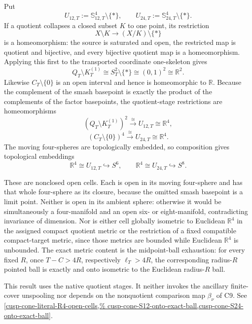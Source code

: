 \begin{auditrecord}
\Verified Put
\[
 U_{12,T}:=\mathbb S_{12,T}^4\setminus\{*\},
 \qquad
 U_{24,T}:=\mathbb S_{24,T}^4\setminus\{*\}.
\]
If a quotient collapses a closed subset \(K\) to one point, its restriction
\[
 X\setminus K\longrightarrow (X/K)\setminus\{*\}
\]
is a homeomorphism: the source is saturated and open, the restricted map is
quotient and bijective, and every bijective quotient map is a homeomorphism.
Applying this first to the transported coordinate one-skeleton gives
\[
 Q_T\setminus K_T^{(1)}
 \cong S_T^2\setminus\{*\}
 \cong (0,1)^2\cong\mathbb R^2.
\]
Likewise \(C_T\setminus\{0\}\) is an open interval and hence is
homeomorphic to \(\mathbb R\).  Because the complement of the smash
basepoint is exactly the product of the complements of the factor
basepoints, the quotient-stage restrictions are homeomorphisms
\[
 (Q_T\setminus K_T^{(1)})^2
 \xrightarrow{\ \cong\ }U_{12,T}\cong\mathbb R^4,
\]
\[
 (C_T\setminus\{0\})^4
 \xrightarrow{\ \cong\ }U_{24,T}\cong\mathbb R^4.
\]
The moving four-spheres are topologically embedded, so composition gives
topological embeddings
\[
 \mathbb R^4\cong U_{12,T}\hookrightarrow S^6,
 \qquad
 \mathbb R^4\cong U_{24,T}\hookrightarrow S^8.
\]

These are nonclosed open cells.  Each is open in its moving four-sphere and
has that whole four-sphere as its closure, because the omitted smash
basepoint is a limit point.  Neither is open in its ambient sphere:
otherwise it would be simultaneously a four-manifold and an open six- or
eight-manifold, contradicting invariance of dimension.  Nor is either cell
globally isometric to Euclidean \(\mathbb R^4\) in the assigned compact
quotient metric or the restriction of a fixed compatible compact-target
metric, since those metrics are bounded while Euclidean \(\mathbb R^4\) is
unbounded.  The exact metric content is the midpoint-ball exhaustion:
for every fixed \(R\), once \(T-C>4R\), respectively \(\ell_T>4R\), the
corresponding radius-\(R\) pointed ball is exactly and onto isometric to the
Euclidean radius-\(R\) ball.

This result uses the native quotient stages.  It neither invokes the
ancillary finite-cover unspooling nor depends on the nonquotient comparison
map \(\beta_\nu\) of C9.  See
\cref{cusp-cone-literal-R4-open-cells,%
cusp-cone-S12-onto-exact-ball,cusp-cone-S24-onto-exact-ball}.
\end{auditrecord}

